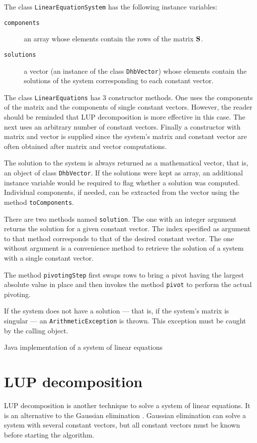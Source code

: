 \documentclass[twoside]{book}
\begin{document}
The class {\tt LinearEquationSystem} has the following instance
variables:
\begin{description}
  \item[\tt components] an array whose elements contain the rows of the
  matrix ${\bf S}$.
  \item[\tt solutions] a vector (an instance of the class {\tt DhbVector})
  whose elements contain the solutions of the
  system corresponding to each constant vector.
\end{description}

The class {\tt LinearEquations} has 3 constructor methods. One
uses the components of the matrix and the components of single
constant vectors. However, the reader should be reminded that LUP
decomposition is more effective in this case. The next uses an
arbitrary number of constant vectors. Finally a constructor with
matrix and vector is supplied since the system's matrix and
constant vector are often obtained after matrix and vector
computations.

The solution to the system is always returned as a mathematical
vector, that is, an object of class {\tt DhbVector}. If the
solutions were kept as array, an additional instance variable
would be required to flag whether a solution was computed.
Individual components, if needed, can be extracted from the vector
using the method {\tt toComponents}.

There are two methods named {\tt solution}. The one with an
integer argument returns the solution for a given constant vector.
The index specified as argument to that method corresponds to that
of the desired constant vector. The one without argument is a
convenience method to retrieve the solution of a system with a
single constant vector.

The method {\tt pivotingStep} first swaps rows to bring a pivot
having the largest absolute value in place and then invokes the
method {\tt pivot} to perform the actual pivoting.

If the system does not have a solution --- that is, if the
system's matrix is singular ---  an {\tt ArithmeticException} is
thrown. This exception must be caught by the calling object.


\begin{listing} Java implementation of a system of linear equations \label{lj:lineqs}

\end{listing}

\section{LUP decomposition}
\label{sec:lup} LUP decomposition is another technique to solve a
system of linear equations. It is an alternative to the Gaussian
elimination \cite{CorLeiRiv}. Gaussian elimination can solve a
system with several constant vectors, but all constant vectors
must be known before starting the algorithm.
\end{document}
